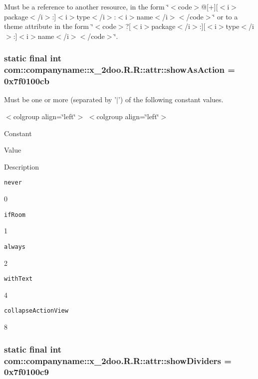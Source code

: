 Must be a reference to another resource, in the form \char`\"{}$<$code$>$@\mbox{[}+\mbox{]}\mbox{[}$<$i$>$package$<$/i$>$:\mbox{]}$<$i$>$type$<$/i$>$:$<$i$>$name$<$/i$>$$<$/code$>$\char`\"{} or to a theme attribute in the form \char`\"{}$<$code$>$?\mbox{[}$<$i$>$package$<$/i$>$:\mbox{]}\mbox{[}$<$i$>$type$<$/i$>$:\mbox{]}$<$i$>$name$<$/i$>$$<$/code$>$\char`\"{}. \hypertarget{classcom_1_1companyname_1_1x__2doo_1_1_r_1_1attr_5b7e0b00999850a072b8c178d14a5a76}{
\subsubsection[{showAsAction}]{\setlength{\rightskip}{0pt plus 5cm}static final int com::companyname::x\_\-2doo.R.R::attr::showAsAction = 0x7f0100cb}}
\label{classcom_1_1companyname_1_1x__2doo_1_1_r_1_1attr_5b7e0b00999850a072b8c178d14a5a76}


Must be one or more (separated by '$|$') of the following constant values. \begin{TabularC}{0}
\hline
\end{TabularC}
$<$colgroup align=\char`\"{}left\char`\"{}$>$ $<$colgroup align=\char`\"{}left\char`\"{}$>$ 

Constant

Value

Description 

{\tt never}

0

{\tt ifRoom}

1

{\tt always}

2

{\tt withText}

4

{\tt collapseActionView}

8\hypertarget{classcom_1_1companyname_1_1x__2doo_1_1_r_1_1attr_e7a00a5551b4b5d4b33a0d77a9794640}{
\subsubsection[{showDividers}]{\setlength{\rightskip}{0pt plus 5cm}static final int com::companyname::x\_\-2doo.R.R::attr::showDividers = 0x7f0100c9}}
\label{classcom_1_1companyname_1_1x__2doo_1_1_r_1_1attr_e7a00a5551b4b5d4b33a0d77a9794640}


